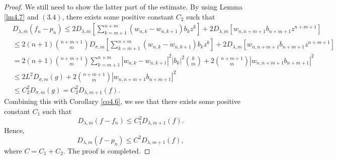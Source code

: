 \documentclass[10pt,a4paper]{amsart}
\begin{document}
\begin{proof}
We still need to show the latter part of the estimate. By using Lemma \ref{lm4.7} and \((3.4)\), there exists some positive constant ${C_2}$ such that
\begin{align*}
&D_{\lambda ,m}(f_n - p_n)\le 2{D_{\lambda ,m}}\left[ {\sum\limits_{k = m+1}^{n + m} {({w_{n,k}} - {w_{n,k + 1}})} {b_k}{z^k}} \right] + 2{D_{\lambda ,m}}\left[ {{w_{n,n + m + 1}}{b_{n + m +1}}{z^{n + m + 1}}} \right] \\
&\le 2(n + 1) \binom{n+m+1}{m} D_{\sigma ,m} \left[ \sum_{k = m+1}^{n + m} (w_{n,k} - w_{n,k + 1}) b_k z^k \right] + 2{D_{\lambda ,m}}\left[ {{w_{n,n + m + 1}}{b_{n + m + 1}}{z^{n + m + 1}}} \right] \\
&= 2(n + 1) \binom{n+m+1}{m} \sum_{k = m+1}^{n + m}
|w_{n,k} - w_{n,k+1}|^2 |b_k|^2 \binom{k}{m} + 2\binom{n+m+1}{m}|w_{n,n+m+1} b_{n+m+1}|^{2}\\
&\le 2L^2 D_{\sigma ,m}(g) + 2\binom{n+m+1}{m}|w_{n,n+m+1} b_{n+m+1}|^{2}\\
&\le C_2^2{D_{\sigma ,m}}(g) = C_2^2{D_{\lambda ,m+1}}(f). \tag{3.8}
\end{align*}
Combining this with Corollary \ref{co4.6}, we see that there exists some positive constant ${C_1}$ such that
\begin{equation}
D_{\lambda ,m}(f - f_n) \le  C_1^2 D_{\lambda ,m+1}(f). \tag{3.9}
\end{equation}
Hence,
\[
D_{\lambda,m}(f - p_n) \le C^2 D_{\lambda,m+1}(f), \tag{3.10}
\]
where $C = {C_1} + {C_2}$. The proof is completed.
\end{proof}
\end{document}
